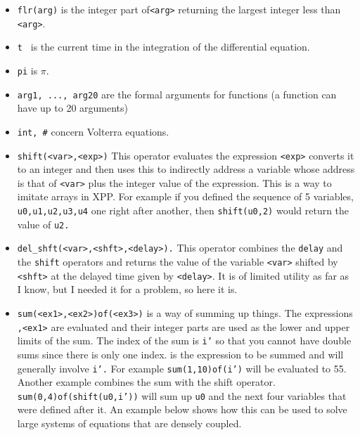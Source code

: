 \documentclass{article}
\begin{document}
\begin{itemize}
the program of the maximal possible delay so it can allocate storage.
(See the section on the NUMERICS menus.)
\item {\tt  flr(arg)}  is the integer part of{\tt  <arg>} returning the largest integer less than {\tt <arg>}.  
\item  {\tt t } is the current time in the integration of the differential equation.
\item {\tt  pi}  is $\pi.$ 
\item {\tt arg1, ..., arg20} are the formal arguments for functions (a function can have up to 20 arguments) 
\item {\tt int, \#} concern Volterra equations.
\item {\tt shift(<var>,<exp>)} This operator evaluates the expression
{\tt <exp>} converts it to an integer and then uses this to indirectly
address a variable whose address is that of {\tt <var>} plus the
integer value of the expression.  This is a way to imitate arrays in
XPP.  For example if you defined the sequence of 5 variables, {\tt
u0,u1,u2,u3,u4} one right after another, then {\tt shift(u0,2)} would
return the value of {\tt u2.}
\item {\tt del\_shft(<var>,<shft>,<delay>).} This operator combines the
{\tt delay} and the {\tt shift} operators and returns the value of the
variable {\tt <var>} shifted by {\tt <shft>} at the delayed time given
by {\tt <delay>}.  It is of limited utility as far as I know, but I
needed it for a problem, so here it is.  
\item {\tt sum(<ex1>,<ex2>)of(<ex3>)} is a way of summing up things.
The expressions {\tt <ex1>,<ex1>} are evaluated and their integer
parts are used as the lower and upper limits of the sum.  The index of
the sum is {\tt i'} so that you cannot have double sums since there is
only one index.  {\tt <ex3>} is the expression to be summed and will
generally involve {\tt i'.}  For example  {\tt sum(1,10)of(i')} will
be evaluated to 55.  Another example combines the sum with the shift
operator.  {\tt sum(0,4)of(shift(u0,i'))} will sum up {\tt u0} and the
next four variables that were defined after it.  An example below
shows how this can be used to solve large systems of equations that
are densely coupled. 
\end{itemize}
\end{document}
